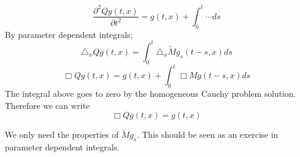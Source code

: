 \begin{equation*}
 \frac{\partial^2 Qg(t,x)}{\partial t^2} = g(t,x) + \int^t_0 \cdots ds
\end{equation*}
By parameter dependent integrals;
\begin{equation*}
 \triangle_x Qg(t,x) =\int^t_0 \triangle_x \tilde{M}g_s(t-s,x) ds
\end{equation*}
\begin{equation*}
 \Box Qg(t,x) = g(t,x) + \int^t_0 \Box Mg(t-s,x)ds
\end{equation*}
The integral above goes to zero by the homogeneous Cauchy problem solution. 
Therefore we can write 
\begin{equation}
 \Box Qg(t,x) = g(t,x)
\end{equation}
\begin{rm}
 We only need the properties of $\tilde{M}g_s$. This should be seen as an exercise in parameter dependent integrals. 
\end{rm}
